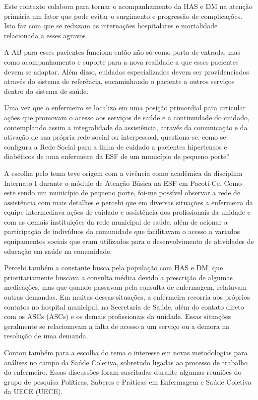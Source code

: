 Este contexto colabora para tornar o acompanhamento da \acrshort{HAS} e \acrshort{DM} na atenção primária um fator que pode evitar o surgimento e progressão de complicações. Isto faz com que se reduzam as internações hospitalares e mortalidade relacionada a esses agravos \cite{da2012associaccao}.

A \acrshort{AB} para esses pacientes funciona então não só como porta de entrada, mas como acompanhamento e suporte para a nova realidade a que esses pacientes devem se adaptar. Além disso, cuidados especializados devem ser providenciados através do sistema de referência, encaminhando o paciente a outros serviços dentro do sistema de saúde. 

Uma vez que o enfermeiro se localiza em uma posição primordial para articular ações que promovam o acesso aos serviços de saúde e a continuidade do cuidado, contemplando assim a integralidade da assistência, através da comunicação e da ativação de sua própria rede social ou interpessoal, questiona-se: como se configura a Rede Social para a linha de cuidado a pacientes hipertensos e diabéticos de uma enfermeira da \acrshort{ESF} de um município de pequeno porte?

A escolha pelo tema teve origem com a vivência como acadêmica da disciplina Internato I durante o módulo de Atenção Básica na \acrshort{ESF} em Pacoti-Ce. Como este sendo um município de pequeno porte, foi-me possível observar a rede de assistência com mais detalhes e percebi que em diversas situações a enfermeira da equipe intermediava ações de cuidado e assistência dos profissionais da unidade e com as demais instituições da rede municipal de saúde, além de acionar a participação de indivíduos da comunidade que facilitavam o acesso a variados equipamentos sociais que eram utilizados para o desenvolvimento de atividades de educação em saúde na comunidade. 

Percebi também a constante busca pela população com \acrshort{HAS} e \acrshort{DM}, que prioritariamente buscava a consulta médica devido a prescrição de algumas medicações, mas que quando passavam pela consulta de enfermagem, relatavam outras demandas. Em muitas dessas situações, a enfermeira recorria aos próprios contatos no hospital municipal, na Secretaria de Saúde, além do contato direto com os \acrlong{ASCs} (\acrshort{ASCs}) e os demais profissionais da unidade. Essas situações geralmente se relacionavam a falta de acesso a um serviço ou a demora na resolução de uma demanda. 

Contou também para a escolha do tema o interesse em novas metodologias para análises no campo da Saúde Coletiva, sobretudo ligadas ao processo de trabalho do enfermeiro. Essas discussões foram suscitadas durante algumas reuniões do grupo de pesquisa Políticas, Saberes e Práticas em Enfermagem e Saúde Coletiva da \acrlong{UECE} (\acrshort{UECE}).  

